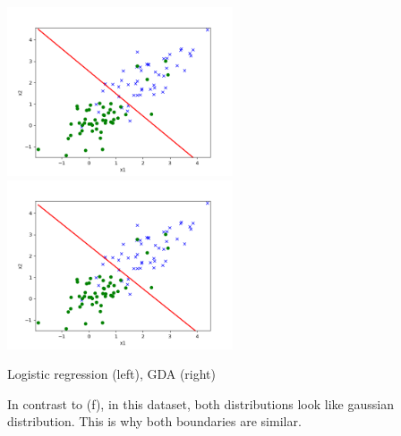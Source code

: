 \begin{answer}

\includegraphics[width=0.5\textwidth]{linearclass/logreg_plot_2_valid.png}
\includegraphics[width=0.5\textwidth]{linearclass/gda_plot_2_valid.png}

Logistic regression (left), GDA (right)

In contrast to (f), in this dataset, both distributions look like gaussian distribution. This is why both boundaries are similar.

\end{answer}
